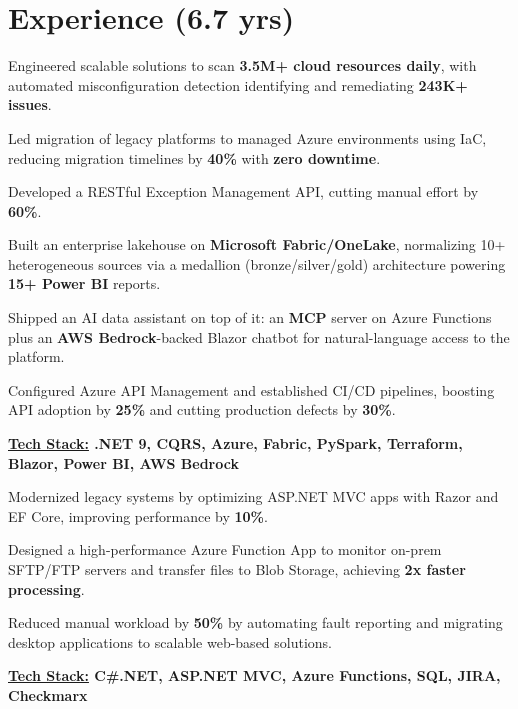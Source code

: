 \documentclass[]{deedy-resume-openfont}
\begin{document}
\begin{minipage}[t]{0.66\textwidth} 


\section{Experience \textbf{\small  (6.7 yrs)}}


\vspace{\topsep} 
\begin{tightemize}
\item Engineered scalable solutions to scan \textbf{3.5M+ cloud resources daily}, with automated misconfiguration detection identifying and remediating \textbf{243K+ issues}.
\item Led migration of legacy platforms to managed Azure environments using IaC, reducing migration timelines by \textbf{40\%} with \textbf{zero downtime}.
\item Developed a RESTful Exception Management API, cutting manual effort by \textbf{60\%}.
\item Built an enterprise lakehouse on \textbf{Microsoft Fabric/OneLake}, normalizing 10+ heterogeneous sources via a medallion (bronze/silver/gold) architecture powering \textbf{15+ Power BI} reports.
\item Shipped an AI data assistant on top of it: an \textbf{MCP} server on Azure Functions plus an \textbf{AWS Bedrock}-backed Blazor chatbot for natural-language access to the platform.
\item Configured Azure API Management and established CI/CD pipelines, boosting API adoption by \textbf{25\%} and cutting production defects by \textbf{30\%}.
\item \textbf{\underline{Tech Stack:} .NET 9, CQRS, Azure, Fabric, PySpark, Terraform, Blazor, Power BI, AWS Bedrock}
\end{tightemize}
\sectionsep

\begin{tightemize}
\item Modernized legacy systems by optimizing ASP.NET MVC apps with Razor and EF Core, improving performance by \textbf{10\%}.
\item Designed a high-performance Azure Function App to monitor on-prem SFTP/FTP servers and transfer files to Blob Storage, achieving \textbf{2x faster processing}.
\item Reduced manual workload by \textbf{50\%} by automating fault reporting and migrating desktop applications to scalable web-based solutions.
\item \textbf{\underline{Tech Stack:} C\#.NET, ASP.NET MVC, Azure Functions, SQL, JIRA, Checkmarx}
\end{tightemize}
\sectionsep



\end{minipage}
\end{document}

